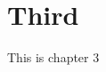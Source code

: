 \documentclass[../main]{subfiles}
\begin{document}
\chapter{Third}
\label{chap:third}

This is chapter 3
\end{document}
